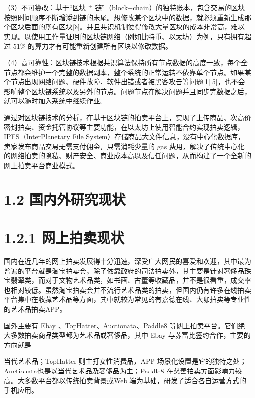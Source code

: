 \documentclass[
  10
]{article}
\begin{document}
（3）不可篡改：基于``区块 \(^ +\)
链''（block+chain）的独特账本，包含交易的区块按照时间顺序不断增添到链的末尾。想修改某个区块中的数据，就必须重新生成那个区块后面的所有区块{[}8{]}。并且共识机制使得修改大量区块的成本非常高，难以实现。以使用工作量证明的区块链网络（例如比特币、以太坊）为例，只有拥有超过
\(51 \%\) 的算力才有可能重新创建所有区块以修改数据。

（4）高可靠性：区块链技术根据共识算法保持所有节点数据的高度一致，每个全节点都会维护一个完整的数据副本，整个系统的正常运转不依靠单个节点。如果某个节点出现网络问题、硬件故障、软件出错或者被黑客攻击等问题{[}1{]}{[}5{]}，也不会影响整个区块链系统以及另外的节点。问题节点在解决问题并且同步完数据之后，就可以随时加入系统中继续作业。

通过对区块链技术的分析，在基于区块链的拍卖平台上，实现了上传商品、次高价密封拍卖、资金托管协议等主要功能，在以太坊上使用智能合约实现拍卖逻辑，IPFS（InterPlanetary
File
System）存储商品大文件信息，没有中心化数据库，卖家发布商品交易无需支付佣金，只需消耗少量的
gas
费用，解决了传统中心化的网络拍卖的隐私、财产安全、商业成本高以及信任问题，从而构建了一个全新的网上拍卖平台商业模式。

\section{1.2
国内外研究现状}\label{ux56fdux5185ux5916ux7814ux7a76ux73b0ux72b6}

\section{1.2.1 网上拍卖现状}\label{ux7f51ux4e0aux62cdux5356ux73b0ux72b6}

国内在近几年的网上拍卖发展得十分迅速，深受广大网民的喜爱和欢迎，其中最为普遍的平台就是淘宝拍卖会，除了依靠政府的司法拍卖外，其主要是针对奢侈品珠宝翡翠类，而对于文物艺术品类，如书画、古董等收藏品，并不是很看重，成交率也相对较低。虽然淘宝拍卖会并不流行艺术品类的拍卖，但国内仍有许多在线拍卖平台集中在收藏艺术品等方面，其中就较为常见的有嘉德在线、大咖拍卖等专业性的艺术品拍卖APP。

国外主要有 Ebay 、TopHatter、Auctionata、Paddle8
等网上拍卖平台。它们绝大多数拍卖商品类型都为艺术品或奢侈品，其中 Ebay
与苏富比签约合作，主要的方向就是

当代艺术品；TopHatter 则主打女性消费品，APP
场景化设置是它的独特之处；Auctionata也是以当代艺术品及奢侈品为主；Paddle8
在慈善拍卖方面影响力较高。大多数平台都以传统拍卖背景或Web
端为基础，研发了适合各自运营方式的手机应用。
\end{document}
